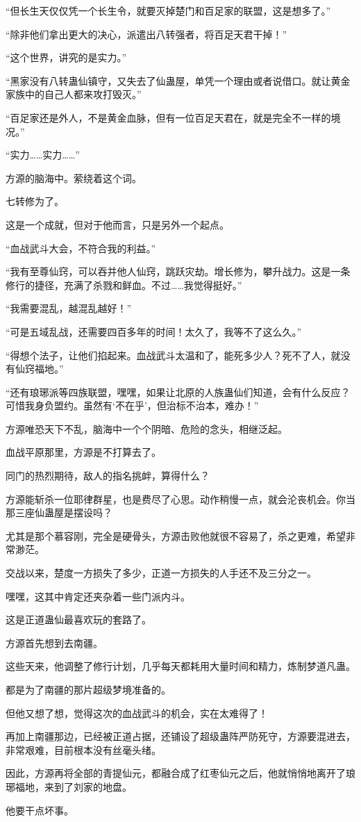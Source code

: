 \begin{this_body}
“但长生天仅仅凭一个长生令，就要灭掉楚门和百足家的联盟，这是想多了。”

“除非他们拿出更大的决心，派遣出八转强者，将百足天君干掉！”

“这个世界，讲究的是实力。”

“黑家没有八转蛊仙镇守，又失去了仙蛊屋，单凭一个理由或者说借口。就让黄金家族中的自己人都来攻打毁灭。”

“百足家还是外人，不是黄金血脉，但有一位百足天君在，就是完全不一样的境况。”

“实力……实力……”

方源的脑海中。萦绕着这个词。

七转修为了。

这是一个成就，但对于他而言，只是另外一个起点。

“血战武斗大会，不符合我的利益。”

“我有至尊仙窍，可以吞并他人仙窍，跳跃灾劫。增长修为，攀升战力。这是一条修行的捷径，充满了杀戮和鲜血。不过……我觉得挺好。”

“我需要混乱，越混乱越好！”

“可是五域乱战，还需要四百多年的时间！太久了，我等不了这么久。”

“得想个法子，让他们掐起来。血战武斗太温和了，能死多少人？死不了人，就没有仙窍福地。”

“还有琅琊派等四族联盟，嘿嘿，如果让北原的人族蛊仙们知道，会有什么反应？可惜我身负盟约。虽然有‘不在乎’，但治标不治本，难办！”

方源唯恐天下不乱，脑海中一个个阴暗、危险的念头，相继泛起。

血战平原那里，方源是不打算去了。

同门的热烈期待，敌人的指名挑衅，算得什么？

方源能斩杀一位耶律群星，也是费尽了心思。动作稍慢一点，就会沦丧机会。你当那三座仙蛊屋是摆设吗？

尤其是那个慕容刚，完全是硬骨头，方源击败他就很不容易了，杀之更难，希望非常渺茫。

交战以来，楚度一方损失了多少，正道一方损失的人手还不及三分之一。

嘿嘿，这其中肯定还夹杂着一些门派内斗。

这是正道蛊仙最喜欢玩的套路了。

方源首先想到去南疆。

这些天来，他调整了修行计划，几乎每天都耗用大量时间和精力，炼制梦道凡蛊。

都是为了南疆的那片超级梦境准备的。

但他又想了想，觉得这次的血战武斗的机会，实在太难得了！

再加上南疆那边，已经被正道占据，还铺设了超级蛊阵严防死守，方源要混进去，非常艰难，目前根本没有丝毫头绪。

因此，方源再将全部的青提仙元，都融合成了红枣仙元之后，他就悄悄地离开了琅琊福地，来到了刘家的地盘。

他要干点坏事。

\end{this_body}

